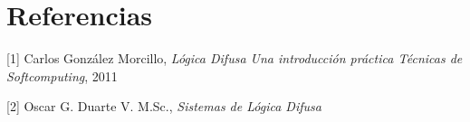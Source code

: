 \section{Referencias}


[1] Carlos González Morcillo,  \textit{Lógica Difusa
Una introducción práctica
Técnicas de Softcomputing}, 2011


[2] Oscar G. Duarte V. M.Sc., \textit{Sistemas de Lógica Difusa }